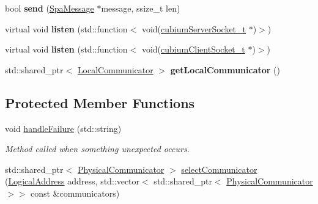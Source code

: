 \begin{DoxyCompactItemize}
\item 
\mbox{\label{classSpaCommunicator_ab8ad476b9d99685eccca336c2eb4d87c}} 
bool {\bfseries send} (\hyperlink{structSpaMessage}{Spa\+Message} $\ast$message, ssize\+\_\+t len)
\item 
\mbox{\label{classSpaCommunicator_ae1634fbdc0d08ca8dd1dd5ba6fa18bbe}} 
virtual void {\bfseries listen} (std\+::function$<$ void(\hyperlink{structcubiumServerSocket__t}{cubium\+Server\+Socket\+\_\+t} $\ast$)$>$)
\item 
\mbox{\label{classSpaCommunicator_af7af26aa5e511a039c036fcbb03735c6}} 
virtual void {\bfseries listen} (std\+::function$<$ void(\hyperlink{structcubiumClientSocket__t}{cubium\+Client\+Socket\+\_\+t} $\ast$)$>$)
\item 
\mbox{\label{classSpaCommunicator_adcd23698bae79308a28709c60288680e}} 
std\+::shared\+\_\+ptr$<$ \hyperlink{classLocalCommunicator}{Local\+Communicator} $>$ {\bfseries get\+Local\+Communicator} ()
\end{DoxyCompactItemize}
\subsection*{Protected Member Functions}
\begin{DoxyCompactItemize}
\item 
\mbox{\label{classSpaCommunicator_aeacd2e5d7178f34cec7701136a6821e7}} 
void \hyperlink{classSpaCommunicator_aeacd2e5d7178f34cec7701136a6821e7}{handle\+Failure} (std\+::string)
\begin{DoxyCompactList}\small\item\em Method called when something unexpected occurs. \end{DoxyCompactList}\item 
std\+::shared\+\_\+ptr$<$ \hyperlink{classPhysicalCommunicator}{Physical\+Communicator} $>$ \hyperlink{classSpaCommunicator_a063bb5ab2b09a46dbf296d151edae289}{select\+Communicator} (\hyperlink{structLogicalAddress}{Logical\+Address} address, std\+::vector$<$ std\+::shared\+\_\+ptr$<$ \hyperlink{classPhysicalCommunicator}{Physical\+Communicator} $>$$>$ const \&communicators)
\end{DoxyCompactItemize}
